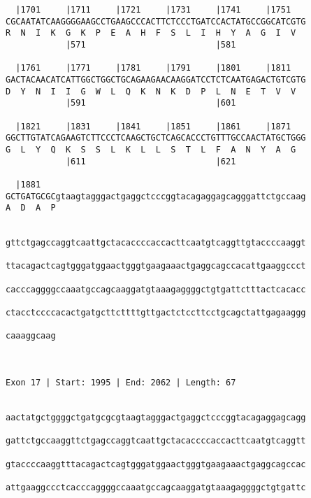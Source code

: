 \documentclass{article}
\begin{document}
\begin{Verbatim}
  |1701     |1711     |1721     |1731     |1741     |1751   
CGCAATATCAAGGGGAAGCCTGAAGCCCACTTCTCCCTGATCCACTATGCCGGCATCGTG
R  N  I  K  G  K  P  E  A  H  F  S  L  I  H  Y  A  G  I  V  
            |571                          |581              
  
  |1761     |1771     |1781     |1791     |1801     |1811   
GACTACAACATCATTGGCTGGCTGCAGAAGAACAAGGATCCTCTCAATGAGACTGTCGTG
D  Y  N  I  I  G  W  L  Q  K  N  K  D  P  L  N  E  T  V  V  
            |591                          |601              
  
  |1821     |1831     |1841     |1851     |1861     |1871   
GGCTTGTATCAGAAGTCTTCCCTCAAGCTGCTCAGCACCCTGTTTGCCAACTATGCTGGG
G  L  Y  Q  K  S  S  L  K  L  L  S  T  L  F  A  N  Y  A  G  
            |611                          |621              
  
  |1881                                                     
GCTGATGCGCgtaagtagggactgaggctcccggtacagaggagcagggattctgccaag
A  D  A  P                                                  
                                                            
  
gttctgagccaggtcaattgctacaccccaccacttcaatgtcaggttgtaccccaaggt
                                                            
ttacagactcagtgggatggaactgggtgaagaaactgaggcagccacattgaaggccct
                                                            
cacccaggggccaaatgccagcaaggatgtaaagaggggctgtgattctttactcacacc
                                                            
ctacctccccacactgatgcttcttttgttgactctccttcctgcagctattgagaaggg
                                                            
caaaggcaag
          
          
 
Exon 17 | Start: 1995 | End: 2062 | Length: 67


aactatgctggggctgatgcgcgtaagtagggactgaggctcccggtacagaggagcagg
                                                            
gattctgccaaggttctgagccaggtcaattgctacaccccaccacttcaatgtcaggtt
                                                            
gtaccccaaggtttacagactcagtgggatggaactgggtgaagaaactgaggcagccac
                                                            
attgaaggccctcacccaggggccaaatgccagcaaggatgtaaagaggggctgtgattc
                                                            

\end{Verbatim}
\end{document}
